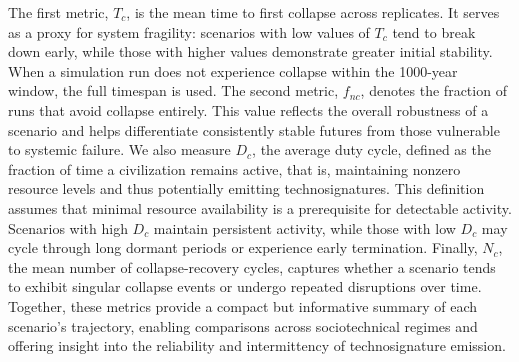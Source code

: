 The first metric, \(T_{c}\), is the mean time to first collapse across replicates. It serves as a proxy for system fragility: scenarios with low values of \(T_{c}\) tend to break down early, while those with higher values demonstrate greater initial stability. When a simulation run does not experience collapse within the 1000-year window, the full timespan is used. The second metric, \(f_{nc}\), denotes the fraction of runs that avoid collapse entirely. This value reflects the overall robustness of a scenario and helps differentiate consistently stable futures from those vulnerable to systemic failure. We also measure \(D_{c}\), the average duty cycle, defined as the fraction of time a civilization remains active, that is, maintaining nonzero resource levels and thus potentially emitting technosignatures. This definition assumes that minimal resource availability is a prerequisite for detectable activity. Scenarios with high \(D_{c}\) maintain persistent activity, while those with low \(D_{c}\) may cycle through long dormant periods or experience early termination. Finally, \(N_{c}\), the mean number of collapse-recovery cycles, captures whether a scenario tends to exhibit singular collapse events or undergo repeated disruptions over time. Together, these metrics provide a compact but informative summary of each scenario's trajectory, enabling comparisons across sociotechnical regimes and offering insight into the reliability and intermittency of technosignature emission.
